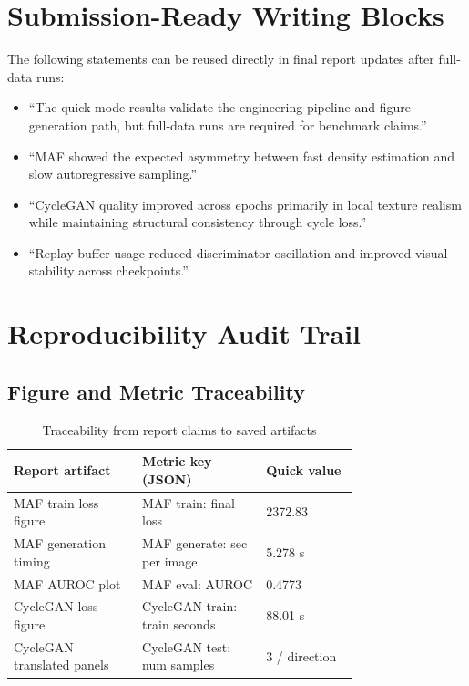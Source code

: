 \documentclass[conference]{IEEEtran}
\begin{document}
\section{Submission-Ready Writing Blocks}
The following statements can be reused directly in final report updates after full-data runs:
\begin{itemize}
\item ``The quick-mode results validate the engineering pipeline and figure-generation path, but full-data runs are required for benchmark claims.'' 
\item ``MAF showed the expected asymmetry between fast density estimation and slow autoregressive sampling.'' 
\item ``CycleGAN quality improved across epochs primarily in local texture realism while maintaining structural consistency through cycle loss.'' 
\item ``Replay buffer usage reduced discriminator oscillation and improved visual stability across checkpoints.'' 
\end{itemize}

\section{Reproducibility Audit Trail}
\subsection{Figure and Metric Traceability}
\begin{table}[!t]
\centering
\caption{Traceability from report claims to saved artifacts}
\begin{tabular}{|p{0.28\linewidth}|p{0.27\linewidth}|p{0.20\linewidth}|}
\hline
\textbf{Report artifact} & \textbf{Metric key (JSON)} & \textbf{Quick value} \\
\hline
MAF train loss figure & MAF train: final loss & 2372.83 \\
\hline
MAF generation timing & MAF generate: sec per image & 5.278 s \\
\hline
MAF AUROC plot & MAF eval: AUROC & 0.4773 \\
\hline
CycleGAN loss figure & CycleGAN train: train seconds & 88.01 s \\
\hline
CycleGAN translated panels & CycleGAN test: num samples & 3 / direction \\
\hline
\end{tabular}
\end{table}
\end{document}
